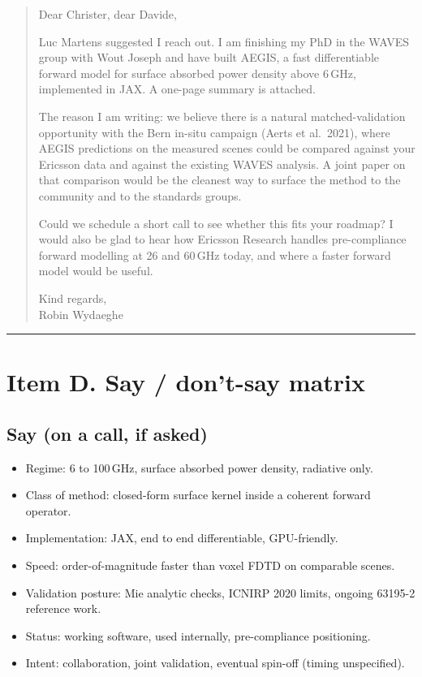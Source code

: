 \documentclass[11pt,a4paper]{article}
\begin{document}
\begin{quote}
Dear Christer, dear Davide,

Luc Martens suggested I reach out. I am finishing my PhD in the WAVES group with Wout Joseph and have built AEGIS, a fast differentiable forward model for surface absorbed power density above 6\,GHz, implemented in JAX. A one-page summary is attached.

The reason I am writing: we believe there is a natural matched-validation opportunity with the Bern in-situ campaign (Aerts et al.\ 2021), where AEGIS predictions on the measured scenes could be compared against your Ericsson data and against the existing WAVES analysis. A joint paper on that comparison would be the cleanest way to surface the method to the community and to the standards groups.

Could we schedule a short call to see whether this fits your roadmap? I would also be glad to hear how Ericsson Research handles pre-compliance forward modelling at 26 and 60\,GHz today, and where a faster forward model would be useful.

Kind regards,\\
Robin Wydaeghe
\end{quote}

\vspace{0.6em}
\hrule
\vspace{0.6em}

\section*{Item D. Say / don't-say matrix}

\subsection*{Say (on a call, if asked)}
\begin{itemize}
  \item Regime: 6 to 100\,GHz, surface absorbed power density, radiative only.
  \item Class of method: closed-form surface kernel inside a coherent forward operator.
  \item Implementation: JAX, end to end differentiable, GPU-friendly.
  \item Speed: order-of-magnitude faster than voxel FDTD on comparable scenes.
  \item Validation posture: Mie analytic checks, ICNIRP 2020 limits, ongoing 63195-2 reference work.
  \item Status: working software, used internally, pre-compliance positioning.
  \item Intent: collaboration, joint validation, eventual spin-off (timing unspecified).
\end{itemize}
\end{document}
